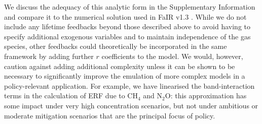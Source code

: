 \documentclass[gmd, manuscript]{copernicus}
\begin{document}
We discuss the adequacy of this analytic form in the Supplementary Information and compare it to the numerical solution used in FaIR v1.3 \citep{Smith2017}. While we do not include any lifetime feedbacks beyond those described above to avoid having to specify additional exogenous variables and to maintain independence of the gas species, other feedbacks could theoretically be incorporated in the same framework by adding further $r$ coefficients to the model. We would, however, caution against adding additional complexity unless it can be shown to be necessary to significantly improve the emulation of more complex models in a policy-relevant application. For example, we have linearised the band-interaction terms in the calculation of ERF due to CH$_4$ and N$_2$O: this approximation has some impact under very high concentration scenarios, but not under ambitious or moderate mitigation scenarios that are the principal focus of policy.
\end{document}

